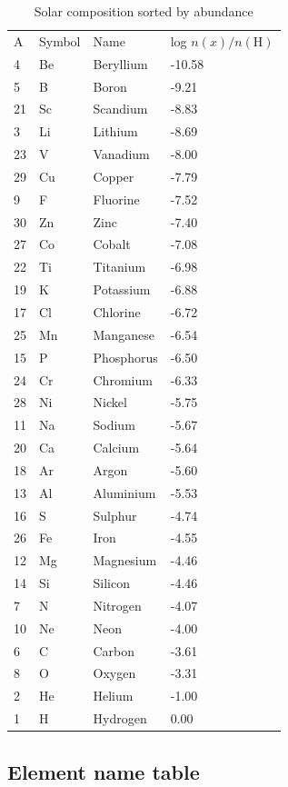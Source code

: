 \begin{table}
\centering
\caption{Solar composition sorted by abundance}
\begin{tabular}{llll}
\hline
\label{tab:CompositionDecreasingOrder}
A& Symbol& Name& log $n(x)/n(\mathrm{H})$\\
4& Be& Beryllium& -10.58\\
5& B& Boron& -9.21\\
21& Sc& Scandium& -8.83\\
3& Li& Lithium& -8.69\\
23& V& Vanadium& -8.00\\
29& Cu& Copper& -7.79\\
9& F& Fluorine& -7.52\\
30& Zn& Zinc& -7.40\\
27& Co& Cobalt& -7.08\\
22& Ti& Titanium& -6.98\\
19& K& Potassium& -6.88\\
17& Cl& Chlorine& -6.72\\
25& Mn& Manganese& -6.54\\
15& P& Phosphorus& -6.50\\
24& Cr& Chromium& -6.33\\
28& Ni& Nickel& -5.75\\
11& Na& Sodium& -5.67\\
20& Ca& Calcium& -5.64\\
18& Ar& Argon& -5.60\\
13& Al& Aluminium& -5.53\\
16& S& Sulphur& -4.74\\
26& Fe& Iron& -4.55\\
12& Mg& Magnesium& -4.46\\
14& Si& Silicon& -4.46\\
7& N& Nitrogen& -4.07\\
10& Ne& Neon& -4.00\\
6& C& Carbon& -3.61\\
8& O& Oxygen& -3.31\\
2& He& Helium& -1.00\\
1& H& Hydrogen& 0.00\\
\hline
\end{tabular}
\end{table}

\subsection{Element name table}

